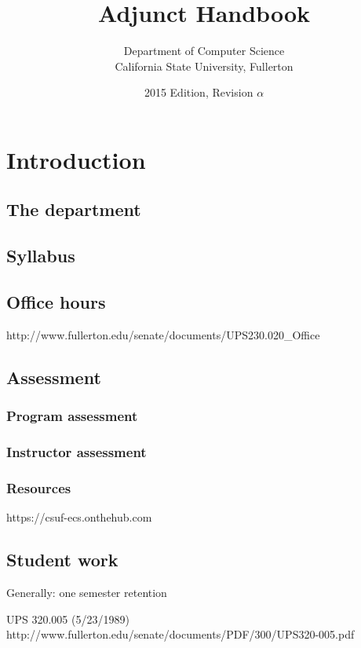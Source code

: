 \documentclass{book}
\begin{document}
\title{Adjunct Handbook}
\author{Department of Computer Science \\ California State University, Fullerton}
\date{2015 Edition, Revision $\alpha$}
\maketitle

\newpage
\tableofcontents

\chapter{Introduction}

\section{The department}

\section{Syllabus}

\section{Office hours}
http://www.fullerton.edu/senate/documents/UPS230.020_Office%

\section{Assessment}
\subsection{Program assessment}
\subsection{Instructor assessment}

\subsection{Resources}
https://csuf-ecs.onthehub.com

\section{Student work}
Generally: one semester retention

UPS 320.005 (5/23/1989)
http://www.fullerton.edu/senate/documents/PDF/300/UPS320-005.pdf
\end{document}
